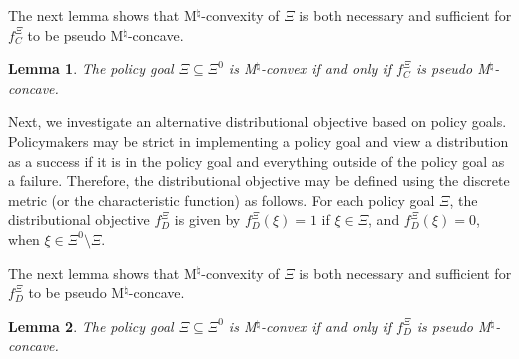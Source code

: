 \documentclass[12pt]{amsart}
\newtheorem{theorem}{Theorem}
\newtheorem{lemma}{Lemma}
\theoremstyle{remark}
\begin{document}
The next lemma shows that M$^{\natural}$-convexity of $\Xi$ is both necessary and sufficient for $f^{\Xi}_C$ to be pseudo M$^{\natural}$-concave.

\begin{lemma}\label{lem:cheb}
The policy goal $\Xi \subseteq \Xi^0$ is M$^{\natural}$-convex if and only if $f^{\Xi}_C$ is pseudo M$^{\natural}$-concave.
\end{lemma}


\begin{comment}
The next theorem establishes that when the distributional objective is given by the negative Chebyshev distance to a
policy goal, which is M$^{\natural}$-convex, the TTC mechanism satisfies the desired conditions.\footnote{In Appendix \ref{app:distances},
we show that when the policy goal $\Xi$ is not M$^{\natural}$-convex, then $f_C^{\Xi}$ is not necessarily pseudo M$^{\natural}$-concave and we also discuss
the alternative diversity index based of the Manhattan distance (or $L_1$ metric) to the policy goal.}

\begin{theorem}\label{thm:fdiverse}
Consider a policy goal $\Xi \subseteq \Xi^0$ that is M$^{\natural}$-convex. Suppose that the distributional objective is $f_C^{\Xi}$. Then the TTC mechanism weakly improves the
distributional objective and satisfies constrained efficiency, individual rationality, and strategy-proofness.
\end{theorem}
\end{comment}

Next, we investigate an alternative distributional objective based on policy goals. Policymakers may be strict in implementing a policy goal and view a distribution as a success
if it is in the policy goal and everything outside of the policy goal as a failure. Therefore, the distributional objective may be defined using the discrete metric
(or the characteristic function) as follows. For each policy goal $\Xi$, the distributional objective $f^{\Xi}_D$ is given by
$f^{\Xi}_D(\xi)=1$ if $\xi \in \Xi$, and $f^{\Xi}_D(\xi)=0$, when $\xi \in \Xi^0 \setminus \Xi$.

The next lemma shows that M$^{\natural}$-convexity of $\Xi$ is both necessary and sufficient for $f^{\Xi}_D$ to be pseudo M$^{\natural}$-concave.

\begin{lemma}\label{lem:policyobjective}
The policy goal $\Xi \subseteq \Xi^0$ is M$^{\natural}$-convex if and only if $f^{\Xi}_D$ is pseudo M$^{\natural}$-concave.
\end{lemma}
\end{document}
